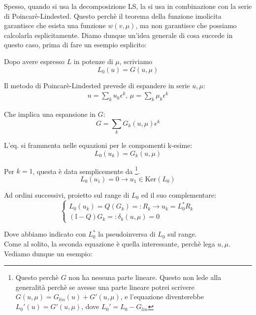 \documentclass{report}
\begin{document}
Spesso, quando si usa la decomposizione LS, la si usa in combinazione con la serie di Poincarè-Lindested. Questo perchè il teorema della funzione imolicita garantisce che esista una funzione $w(v, \mu)$, ma non garantisce che possiamo calcolarla esplicitamente. Diamo dunque un'idea generale di cosa succede in questo caso, prima di fare un esempio esplicito: 

Dopo avere espresso $L$ in potenze di $\mu$, scriviamo 
\begin{equation}
    L_0(u) = G(u, \mu)
\end{equation}

Il metodo di Poincarè-Lindested prevede di espandere in serie $u, \mu$: 
\begin{align}
    u = \sum_k u_k \epsilon^k, \, \mu = \sum_k \mu_k \epsilon^k
\end{align}

Che implica una espansione in $G$: 
\begin{equation}
    G = \sum_k G_k (u, \mu)\epsilon^k
\end{equation}

L'eq. si frammenta nelle equazioni per le compomenti k-esime:
\begin{equation}
    L_0 (u_k) = G_k(u, \mu)
\end{equation}

Per $k=1$, questa è data semplicemente da \footnote{Questo perchè $G$ non ha nessuna parte lineare. Questo non lede alla generalità perchè se avesse una parte lineare potrei scrivere $G(u, \mu) = G_{lin}(u) + G'(u, \mu)$, e l'equazione diventerebbe $L_0' (u) = G'(u, \mu)$, dove $L_0' = L_0 - G_{lin}$}. 
\begin{equation}
    L_0(u_1) = 0  \rightarrow u_1 \in \text{Ker}(L_0)
\end{equation}

Ad ordini successivi, proietto sul range di $L_0$ ed il suo complementare: 
\[\begin{cases}
    L_0 (u_k) = Q(G_k) =: R_k \rightarrow u_k = L_0^*R_k\\ 
    (\mathbb{I}-Q)G_k =: \delta_k(u, \mu) = 0 
\end{cases}\]

Dove abbiamo indicato con $L_0^*$ la pseudoinversa di $L_0$ sul range. \\
Come al solito, la seconda equazione è quella interessante, perchè lega $u, \mu$. \\

Vediamo dunque un esempio: 
\end{document}
